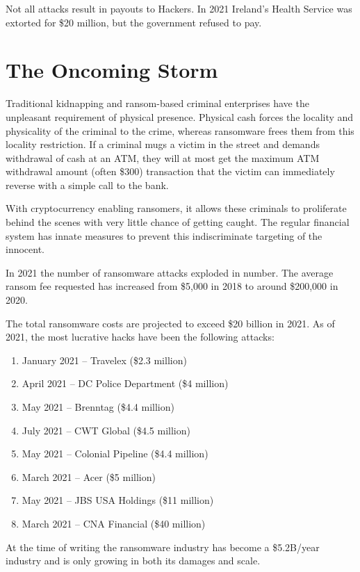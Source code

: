 
Not all attacks result in payouts to Hackers. In 2021 Ireland's Health Service
was extorted for \$20 million, but the government refused to pay.

\section{The Oncoming Storm}

Traditional kidnapping and ransom-based criminal enterprises have the unpleasant
requirement of physical presence. Physical cash forces the locality and
physicality of the criminal to the crime, whereas ransomware frees them from
this locality restriction. If a criminal mugs a victim in the street and demands
withdrawal of cash at an ATM, they will at most get the maximum ATM withdrawal
amount (often \$300) transaction that the victim can immediately reverse with a
simple call to the bank.

With cryptocurrency enabling ransomers, it allows these criminals to proliferate
behind the scenes with very little chance of getting caught. The regular
financial system has innate measures to prevent this indiscriminate targeting of
the innocent.

In 2021 the number of ransomware attacks exploded in number. The average ransom
fee requested has increased from \$5,000 in 2018 to around \$200,000 in 2020.

The total ransomware costs are projected to exceed \$20 billion in 2021. As of
2021, the most lucrative hacks have been the following attacks:

\begin{enumerate}
  \item January 2021 -- Travelex (\$2.3 million)
  \item April 2021 -- DC Police Department (\$4 million)
  \item May 2021 -- Brenntag (\$4.4 million)
  \item July 2021 -- CWT Global (\$4.5 million)
  \item May 2021 -- Colonial Pipeline (\$4.4 million)
  \item March 2021 -- Acer (\$5 million)
  \item May 2021 -- JBS USA Holdings (\$11 million)
  \item March 2021 -- CNA Financial (\$40 million)
\end{enumerate}

At the time of writing the ransomware industry has become a \$5.2B/year industry
and is only growing in both its damages and scale.

